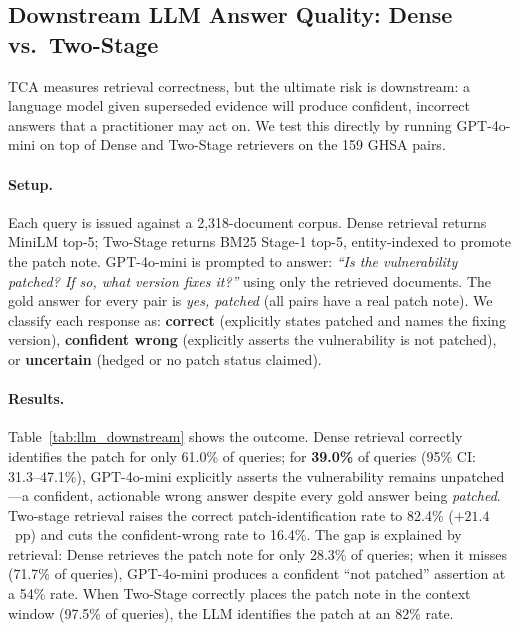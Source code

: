 \documentclass[11pt]{article}
\begin{document}
\subsection{Downstream LLM Answer Quality: Dense vs.\ Two-Stage}
\label{sec:llm_downstream}

TCA measures retrieval correctness, but the ultimate risk is downstream: a language model given superseded evidence will produce confident, incorrect answers that a practitioner may act on. We test this directly by running GPT-4o-mini on top of Dense and Two-Stage retrievers on the 159 GHSA pairs.

\paragraph{Setup.} Each query is issued against a 2,318-document corpus. Dense retrieval returns MiniLM top-5; Two-Stage returns BM25 Stage-1 top-5, entity-indexed to promote the patch note. GPT-4o-mini is prompted to answer: \emph{``Is the vulnerability patched? If so, what version fixes it?''} using only the retrieved documents. The gold answer for every pair is \emph{yes, patched} (all pairs have a real patch note). We classify each response as: \textbf{correct} (explicitly states patched and names the fixing version), \textbf{confident wrong} (explicitly asserts the vulnerability is not patched), or \textbf{uncertain} (hedged or no patch status claimed).

\paragraph{Results.} Table~\ref{tab:llm_downstream} shows the outcome. Dense retrieval correctly identifies the patch for only 61.0\% of queries; for \textbf{39.0\%} of queries (95\% CI: 31.3--47.1\%), GPT-4o-mini explicitly asserts the vulnerability remains unpatched---a confident, actionable wrong answer despite every gold answer being \emph{patched}. Two-stage retrieval raises the correct patch-identification rate to 82.4\% ($+21.4$~pp) and cuts the confident-wrong rate to 16.4\%. The gap is explained by retrieval: Dense retrieves the patch note for only 28.3\% of queries; when it misses (71.7\% of queries), GPT-4o-mini produces a confident ``not patched'' assertion at a 54\% rate. When Two-Stage correctly places the patch note in the context window (97.5\% of queries), the LLM identifies the patch at an 82\% rate.
\end{document}
